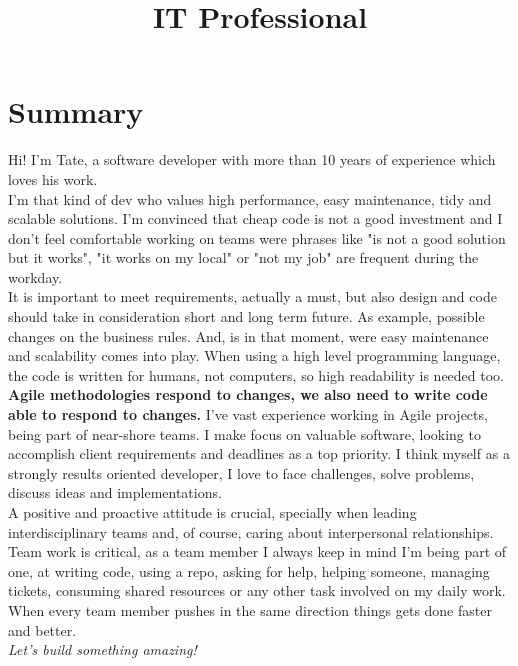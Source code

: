 \documentclass[11pt,a4paper,sans]{moderncv}        %
\title{IT Professional}                               %
\begin{document}
\makecvtitle

\section{Summary}

Hi! I'm Tate, a software developer with more than 10 years of experience which loves his work.\\
I'm that kind of dev who values high performance, easy maintenance, tidy and scalable solutions.
I'm convinced that cheap code is not a good investment and I don't feel comfortable working on teams were phrases like "is not a
good solution but it works", "it works on my local" or "not my job" are frequent during the workday.\\
It is important to meet requirements, actually a must, but also design and code should take in consideration short and long term future.
As example, possible changes on the business rules. And, is in that moment, were easy maintenance and scalability comes into play.
When using a high level programming language, the code is written for humans, not computers, so high readability is needed too.
\textbf{Agile methodologies respond to changes, we also need to write code able to respond to changes.}
I've vast experience working in Agile projects, being part of near-shore teams.
I make focus on valuable software, looking to accomplish client requirements and deadlines as a top priority.
I think myself as a strongly results oriented developer, I love to face challenges, solve problems, discuss ideas and implementations.\\
A positive and proactive attitude is crucial, specially when leading interdisciplinary teams and, of course,
caring about interpersonal relationships.\\
Team work is critical, as a team member I always keep in mind I'm being part of one, at writing code, using a repo,
asking for help, helping someone, managing tickets, consuming shared resources or any other task involved on my daily work.
When every team member pushes in the same direction things gets done faster and better.\\
\textit{Let's build something amazing!}\\
\end{document}
